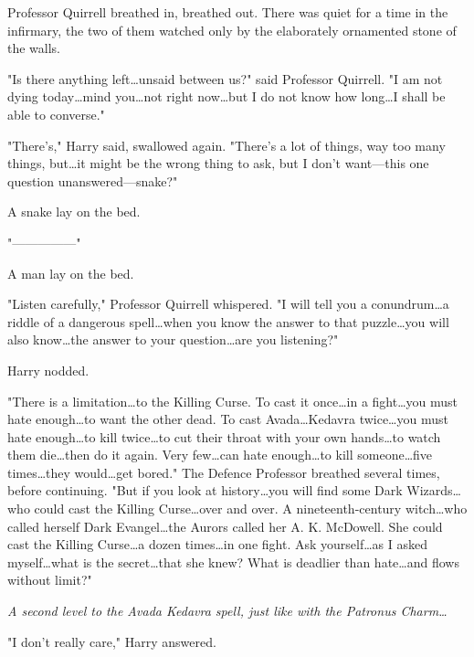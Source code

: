 Professor Quirrell breathed in, breathed out. There was quiet for a time in the
infirmary, the two of them watched only by the elaborately ornamented stone of
the walls.

"Is there anything left…unsaid between us?" said Professor Quirrell. "I
am not dying today…mind you…not right now…but I do not
know how long…I shall be able to converse."

"There's," Harry said, swallowed again. "There's a lot of things, way too many
things, but…it might be the wrong thing to ask, but I don't want—this
one question unanswered—snake?"

A snake lay on the bed.

"—————"

A man lay on the bed.

"Listen carefully," Professor Quirrell whispered. "I will tell you a
conundrum…a riddle of a dangerous spell…when you know the
answer to that puzzle…you will also know…the answer to your
question…are you listening?"

Harry nodded.

"There is a limitation…to the Killing Curse. To cast it once…in
a fight…you must hate enough…to want the other dead. To cast
Avada…Kedavra twice…you must hate enough…to kill
twice…to cut their throat with your own hands…to watch them
die…then do it again. Very few…can hate enough…to kill
someone…five times…they would…get bored." The Defence
Professor breathed several times, before continuing. "But if you look at
history…you will find some Dark Wizards…who could cast the
Killing Curse…over and over. A nineteenth-century witch…who
called herself Dark Evangel…the Aurors called her A. K. McDowell. She
could cast the Killing Curse…a dozen times…in one fight. Ask
yourself…as I asked myself…what is the secret…that she
knew? What is deadlier than hate…and flows without limit?"

\emph{A second level to the Avada Kedavra spell, just like with the Patronus
Charm…}

"I don't really care," Harry answered.

